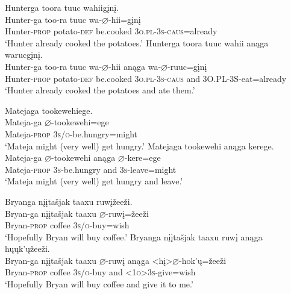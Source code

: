 \documentclass[output=paper]{LSP/langsci}
\begin{document}
\begin{exe}
\ex
\begin{xlist} 
\ex 
\glll Hunterga 	toora 	tuuc 	wahiig\k{i}n\k{i}. \\
Hunter-ga 	too-ra 	tuuc 	wa-$\varnothing$-hii=g\k{i}n\k{i} \\
	Hunter-\textsc{prop} potato-\textsc{def} 	be.cooked 	\textsc{3o.pl-3s-caus}=already \\
\trans `Hunter already cooked the potatoes.'
\ex 
\glll Hunterga  	toora 		tuuc 		wahii 	an\k{a}ga 	warucg\k{i}n\k{i}. \\
Hunter-ga  too-ra	tuuc 	wa-$\varnothing$-hii 	 an\k{a}ga wa-$\varnothing$-ruuc=g\k{i}n\k{i} \\
Hunter-\textsc{prop} potato-\textsc{def} 	be.cooked	 \textsc{3o.pl-3s-caus} and 3O.PL-3S-eat=already\\
`Hunter already cooked the potatoes and ate them.'
\end{xlist}
\ex
\begin{xlist}
\ex	
\glll Matejaga 	tookewehiege. \\
Mateja-ga 	$\varnothing$-tookewehi=ege \\
	Mateja-\textsc{prop} 	\textsc{3s/o}-be.hungry=might \\
\trans `Mateja might (very well) get hungry.'
\ex 
\glll Matejaga 			tookewehi 		an\k{a}ga 	kerege. \\
Mateja-ga 			$\varnothing$-tookewehi 	an\k{a}ga 	$\varnothing$-kere=ege  \\
Mateja-\textsc{prop} 	\textsc{3s}-be.hungry and 			\textsc{3s}-leave=might \\
\trans `Mateja might (very well) get hungry and leave.'
\end{xlist}

\ex	
\begin{xlist}
\ex 
\glll Bryanga 			{n\k{i}\k{i}ta\v{s}jak taaxu }	ruw\k{i}\v{z}ee\v{z}i. \\
Bryan-ga 		{n\k{i}\k{i}ta\v{s}jak 	taaxu }	$\varnothing$-ruw\k{i}=\v{z}ee\v{z}i \\
	Bryan-\textsc{prop} 	coffee	\textsc{3s/o}-buy=wish \\
\trans `Hopefully Bryan will buy coffee.'
\ex 
\glll Bryanga 	{n\k{i}\k{i}ta\v{s}jak taaxu }	ruw\k{i} 		an\k{a}ga 	h\k{u}\k{u}k'\k{u}\v{z}ee\v{z}i. \\
Bryan-ga 	{n\k{i}\k{i}ta\v{s}jak taaxu }	$\varnothing$-ruw\k{i}  	an\k{a}ga 	<h\k{i}>$\varnothing$-hok'\k{u}=\v{z}ee\v{z}i \\
	Bryan-\textsc{prop} 	coffee 		\textsc{3s/o}-buy		 and 		\textsc{<1o>3s}-give=wish \\
\trans `Hopefully Bryan will buy coffee and give it to me.'
\end{xlist}
\end{exe}	
	
\end{document}
